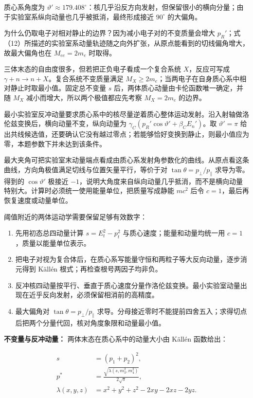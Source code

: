 \documentclass[12pt,a4paper,UTF8]{ctexart}
\newcommand{\tightlist}{\setlength{\itemsep}{0pt}\setlength{\parskip}{0pt}}
\begin{document}
质心系角度为
\(\vartheta'\approx179.408^\circ\)：核几乎沿反方向发射，但保留很小的横向分量；由于实验室系纵向动量也几乎被抵消，最终形成接近
\(90^\circ\) 的大偏角。

为什么仍取电子对相对静止的边界？因为减小电子对的不变质量会增大
\(p_R'\)；式（12）所描述的实验室系动量轨迹随之向外扩张，从原点能看到的切线偏角增大，故最大偏角也在
\(M_{ee}=2m_e\) 时取得。

三体末态的自由度很多，但若把正负电子看成一个复合系统 \(X\)，反应可写成
\(\gamma+n\to n+X\)。复合系统不变质量满足
\(M_X\geqslant2m_e\)；当两电子在自身质心系中相对静止时取最小值。固定总不变量
\(s\) 后，两体质心动量由卡伦函数唯一确定，并随 \(M_X\)
减小而增大，所以两个极值都应先考察 \(M_X=2m_e\) 的边界。

最小实验室反冲动量要求质心系中的核尽量逆着质心整体运动发射。沿入射轴做洛伦兹变换后，横向动量不变，纵向动量为
\(\gamma_C(p_R'\cos\vartheta'+\beta_CE_n')\)。取 \(\vartheta'=\pi\)
给出共线候选值，还要确认它没有越过零点；若能够恰好变换到静止，则最小值应为零，本题参数下并未达到该条件。

最大夹角可把实验室末动量端点看成由质心系发射角参数化的曲线。从原点看这条曲线，方向角极值满足切线与位置矢量平行，等价于对
\(\tan\theta=p_\perp/p_\parallel\) 求导为零。得到的 \(\cos\vartheta'\)
极接近
\(-1\)，说明大角度来自纵向动量几乎抵消，而不是横向动量特别大。计算时必须统一使用能量单位，把质量写成静能
\(mc^2\) 后令 \(c=1\)，最后再恢复速度或动量单位。

阈值附近的两体运动学需要保留足够有效数字：

\begin{enumerate}
\def\labelenumi{\arabic{enumi}.}
\tightlist
\item
  先用初态总四动量计算 \(s=E_t^2-p_t^2\) 与质心速度；能量和动量均统一用
  \(c=1\)，质量以能量单位表示。
\item
  把电子对视为复合体后，在质心系写能量守恒和两粒子等大反向动量，逐步消元得到
  Källén 根式；再检查根号两因子均非负。
\item
  反冲核四动量按平行、垂直于质心速度分量作洛伦兹变换。最小实验室动量出现在近乎反向发射，必须保留相消前的高精度。
\item
  最大偏角对 \(\tan\theta=p_\perp/p_\parallel\)
  求导。分母接近零时不能提前四舍五入；求得切点后把两个分量代回，核对角度象限和动量最小值。
\end{enumerate}

\textbf{不变量与反冲动量：} 两体末态在质心系中的动量大小由 Källén
函数给出：

\[\begin{aligned}
s&=(p_1+p_2)^2,\\
p^*&=\frac{\sqrt{\lambda(s,m_3^2,m_4^2)}}{2\sqrt s},\\
\lambda(x,y,z)&=x^2+y^2+z^2-2xy-2xz-2yz.
\end{aligned}\]
\end{document}
